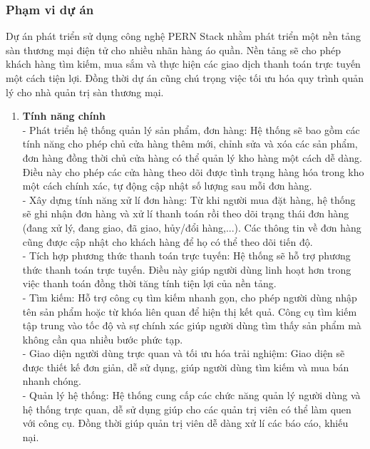         \subsubsection{Phạm vi dự án}
            Dự án phát triển sử dụng công nghệ PERN Stack nhằm phát triển một nền tảng sàn thương mại điện tử cho nhiều nhãn hàng áo quần. Nền tảng sẽ cho phép khách hàng tìm kiếm, mua sắm và thực hiện các giao dịch thanh toán trực tuyến một cách tiện lợi. Đồng thời dự án cũng chú trọng việc tối ưu hóa quy trình quản lý cho nhà quản trị sàn thương mại.\\
            \begin{enumerate}[label=\arabic{section}.\arabic{subsection}.\arabic{subsubsection}.\alph*, leftmargin=3cm]
                \item \textbf{Tính năng chính} \\
                    - Phát triển hệ thống quản lý sản phẩm, đơn hàng: Hệ thống sẽ bao gồm các tính năng cho phép chủ cửa hàng thêm mới, chỉnh sửa và xóa các sản phẩm, đơn hàng đồng thời chủ cửa hàng có thể quản lý kho hàng một cách dễ dàng. Điều này cho phép các cửa hàng theo dõi được tình trạng hàng hóa trong kho một cách chính xác, tự động cập nhật số lượng sau mỗi đơn hàng. \\
                    - Xây dựng tính năng xử lí đơn hàng: Từ khi người mua đặt hàng, hệ thống sẽ ghi nhận đơn hàng và xử lí thanh toán rồi theo dõi trạng thái đơn hàng (đang xử lý, đang giao, đã giao, hủy/đổi hàng,...). Các thông tin về đơn hàng cũng được cập nhật cho khách hàng để họ có thể theo dõi tiến độ. \\
                    - Tích hợp phương thức thanh toán trực tuyến: Hệ thống sẽ hỗ trợ phương thức thanh toán trực tuyến. Điều này giúp người dùng linh hoạt hơn trong việc thanh toán đồng thời tăng tính tiện lợi của nền tảng. \\
                    - Tìm kiếm: Hỗ trợ công cụ tìm kiếm nhanh gọn, cho phép người dùng nhập tên sản phẩm hoặc từ khóa liên quan để hiện thị kết quả. Công cụ tìm kiếm tập trung vào tốc độ và sự chính xác giúp người dùng tìm thấy sản phẩm mà không cần qua nhiều bước phức tạp. \\
                    - Giao diện người dùng trực quan và tối ưu hóa trải nghiệm: Giao diện sẽ được thiết kế đơn giản, dễ sử dụng, giúp người dùng tìm kiếm và mua bán nhanh chóng. \\
                    - Quản lý hệ thống: Hệ thống cung cấp các chức năng quản lý người dùng và hệ thống trực quan, dễ sử dụng giúp cho các quản trị viên có thể làm quen với công cụ. Đồng thời giúp quản trị viên dễ dàng xử lí các báo cáo, khiếu nại.

\end{enumerate}
